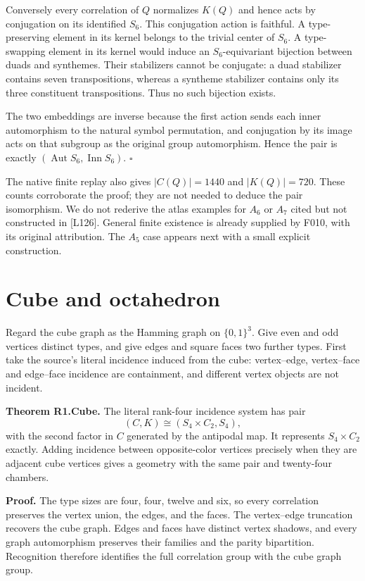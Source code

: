 Conversely every correlation of \(Q\) normalizes \(K(Q)\) and hence acts
by conjugation on its identified \(S_6\). This conjugation action is
faithful. A type-preserving element in its kernel belongs to the trivial
center of \(S_6\). A type-swapping element in its kernel would induce an
\(S_6\)-equivariant bijection between duads and synthemes. Their
stabilizers cannot be conjugate: a duad stabilizer contains seven
transpositions, whereas a syntheme stabilizer contains only its three
constituent transpositions. Thus no such bijection exists.

The two embeddings are inverse because the first action sends each inner
automorphism to the natural symbol permutation, and conjugation by its
image acts on that subgroup as the original group automorphism. Hence
the pair is exactly \((\operatorname{Aut}S_6,\operatorname{Inn}S_6)\).
\(\square\)

The native finite replay also gives \(|C(Q)|=1440\) and \(|K(Q)|=720\).
These counts corroborate the proof; they are not needed to deduce the
pair isomorphism. We do not rederive the atlas examples for \(A_6\) or
\(A_7\) cited but not constructed in {[}L126{]}. General finite
existence is already supplied by F010, with its original attribution.
The \(A_5\) case appears next with a small explicit construction.

\section{Cube and octahedron}\label{cube-and-octahedron}

Regard the cube graph as the Hamming graph on \(\{0,1\}^3\). Give even
and odd vertices distinct types, and give edges and square faces two
further types. First take the source's literal incidence induced from
the cube: vertex--edge, vertex--face and edge--face incidence are
containment, and different vertex objects are not incident.

\textbf{Theorem R1.Cube.} The literal rank-four incidence system has
pair \[
(C,K)\cong(S_4\times C_2,S_4),
\tag{C1}
\] with the second factor in \(C\) generated by the antipodal map. It
represents \(S_4\times C_2\) exactly. Adding incidence between
opposite-color vertices precisely when they are adjacent cube vertices
gives a geometry with the same pair and twenty-four chambers.

\textbf{Proof.} The type sizes are four, four, twelve and six, so every
correlation preserves the vertex union, the edges, and the faces. The
vertex--edge truncation recovers the cube graph. Edges and faces have
distinct vertex shadows, and every graph automorphism preserves their
families and the parity bipartition. Recognition therefore identifies
the full correlation group with the cube graph group.

